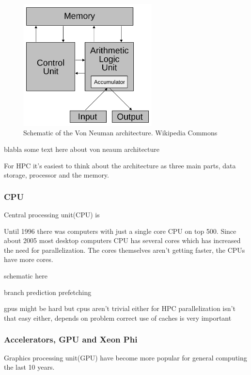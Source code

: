 \documentclass[10pt,a4paper]{article}
\begin{document}
\begin{figure}[h]
    \centering
    \includegraphics[width=7cm]{Von_Neumann_architecture.png}
    \caption{Schematic of the Von Neuman architecture. Wikipedia Commons}
    \label{fig:VonNeuman}
\end{figure}

blabla some text here about von neaum architecture

For HPC it's easiest to think about the architecture as three main parts, data storage, processor and the memory.\cite{intro_hpc}

\subsubsection{CPU}
Central processing unit(CPU) is \cite{introduction_hpc_hager}

Until 1996 there was computers with just a single core CPU on top 500\cite{TOP500}. Since about 2005 most desktop computers CPU has several cores which has increased the need for parallelization. The cores themselves aren't getting faster, the CPUs have more cores.

schematic here

branch prediction
prefetching

gpus might be hard but cpus aren't trivial either for HPC
parallelization isn't that easy either, depends on problem
correct use of caches is very important\cite{drepper2007cpumemory}

\subsubsection{Accelerators, GPU and Xeon Phi}
Graphics processing unit(GPU) have become more popular for general computing the last 10 years.
\end{document}
